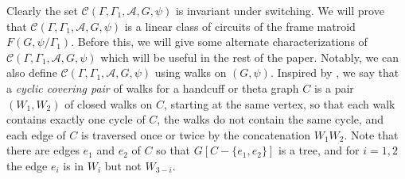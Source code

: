 \documentclass[12pt]{article}
\theoremstyle{definition}
\newcommand{\cA}{\mathcal{A}}
\newcommand{\cC}{\mathcal{C}}
\begin{document}
Clearly the set $\cC(\Gamma, \Gamma_1, \cA, G, \psi)$ is invariant under switching.
We will prove that $\cC(\Gamma, \Gamma_1, \cA, G, \psi)$ is a linear class of circuits of the frame matroid $F(G, \psi/\Gamma_1)$.
Before this, we will give some alternate characterizations of $\cC(\Gamma, \Gamma_1, \cA, G, \psi)$ which will be useful in the rest of the paper.
Notably, we can also define $\cC(\Gamma, \Gamma_1, \cA, G, \psi)$ using walks on $(G, \psi)$.
Inspired by \cite[Definition 5.8]{Bernstein2022}, we say that a \emph{cyclic covering pair} of walks for a handcuff or theta graph $C$ is a pair $(W_1, W_2)$ of closed walks on $C$, starting at the same vertex, so that each walk contains exactly one cycle of $C$, the walks do not contain the same cycle, and each edge of $C$ is traversed once or twice by the concatenation $W_1W_2$.
Note that there are edges $e_1$ and $e_2$ of $C$ so that $G[C - \{e_1, e_2\}]$ is a tree, and for $i = 1,2$ the edge $e_i$ is in $W_i$ but not $W_{3-i}$.
\end{document}
